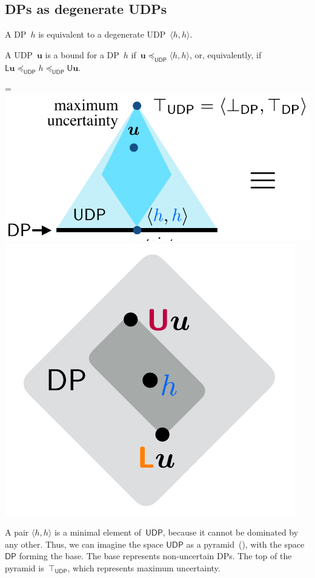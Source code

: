 \documentclass[twocolumn,english]{IEEEconf}
\theoremstyle{plain}
\theoremstyle{definition}
\theoremstyle{definition}
\theoremstyle{plain}
\newcommand{\aword}[1]{\mathsf{#1}}
\newcommand{\vmath}[1]{\aword{#1}}
\newcommand{\posleq}{\preceq}
\newcommand{\ftor}{{h}}
\newcommand{\udpL}{\boldsymbol{\mathsf{L}}}
\newcommand{\udpU}{\boldsymbol{\mathsf{U}}}
\newcommand{\udpsp}{\vmath{UDP}}
\newcommand{\udpleq}{\posleq_\udpsp}
\newcommand{\dpsp}{\vmath{DP}}
\newcommand*{\vcenteredhbox}[1]{\begingroup
\setbox0=\hbox{#1}\parbox{\wd0}{\box0}\endgroup}
\newcommand{\captionsideleft}[2]{
    \medskip
    \begin{minipage}{1.8cm}{
        \hfill
        \protect\captionof{figure}{#1}}\end{minipage}
    \begin{minipage}{6.6cm}
    
    \vcenteredhbox{{#2}}
    \hfill
    \end{minipage}
    \medskip
}
\begin{document}
\subsection{DPs as degenerate UDPs}

A DP~$\ftor$ is equivalent to a degenerate UDP~$\langle\ftor,\ftor\rangle$.

A UDP~$\boldsymbol{u}$ is a bound for a DP~$\ftor$ if~$\boldsymbol{u}\udpleq\langle\ftor,\ftor\rangle$,
or, equivalently, if $\udpL\boldsymbol{u}\udpleq\ftor\udpleq\udpU\boldsymbol{u}$.

\captionsideleft{\label{fig:pyr1}}{\hspace{-9mm}\includegraphics[scale=0.33]{unc_dpcones2}\includegraphics[scale=0.33]{unc_dpcones}}

A pair $\langle\ftor,\ftor\rangle$ is a minimal element of~$\udpsp$,
because it cannot be dominated by any other. Thus, we can imagine
the space $\udpsp$ as a pyramid~(), with the
space~$\dpsp$ forming the base. The base represents non-uncertain
DPs. The top of the pyramid is~$\top_{\udpsp}$, which represents
maximum uncertainty.
\end{document}
